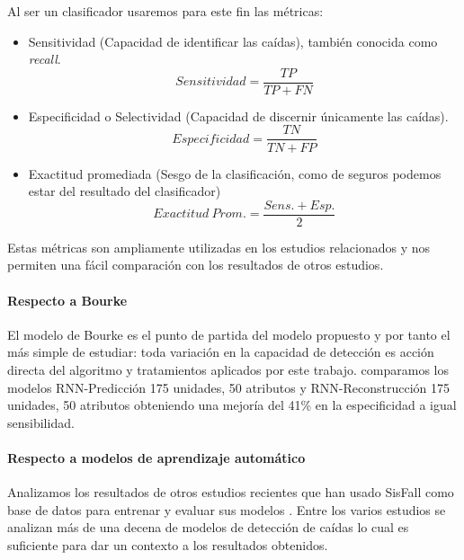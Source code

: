 \documentclass[11pt,a4paper,spanish,twocolumn]{article}
\begin{document}
Al ser un clasificador usaremos para este fin las métricas:
\begin{itemize}
  \item Sensitividad (Capacidad de identificar las caídas), también conocida como \textit{recall}.
  \[
    Sensitividad = \frac{TP}{TP+FN}
  \]
  \item Especificidad o Selectividad (Capacidad de discernir únicamente las caídas).
  \[
    Especificidad = \frac{TN}{TN+FP}
  \]
\item Exactitud promediada (Sesgo de la clasificación, como de seguros podemos estar del resultado del clasificador)
  \[
  Exactitud~Prom.=\frac{Sens.+Esp.}{2}
  \]
\end{itemize}
Estas métricas son ampliamente utilizadas en los estudios relacionados \cite{Noury2007} y nos permiten una fácil comparación con los resultados de otros estudios. 

\paragraph{Respecto a Bourke}
El modelo de Bourke es el punto de partida del modelo propuesto y por tanto el más simple de estudiar: toda variación en la capacidad de detección es acción directa del algoritmo y tratamientos aplicados por este trabajo. comparamos los modelos RNN-Predicción 175 unidades, 50 atributos y RNN-Reconstrucción 175 unidades, 50 atributos obteniendo una mejoría del 41\% en la especificidad a igual sensibilidad.

\begin{table}\caption{\label{tab:ifell:vs:bourke} Especificidad por modelos para $Sens. \geq 99\%$}
\end{table}

\paragraph{Respecto a modelos de aprendizaje automático}
Analizamos los resultados de otros estudios recientes que han usado SisFall como base de datos para entrenar y evaluar sus modelos \cite{Torti2018,Liu2018,Liu2020,Musci2020}. Entre los varios estudios se analizan más de una decena de modelos de detección de caídas lo cual es suficiente para dar un contexto a los resultados obtenidos. 
\end{document}
